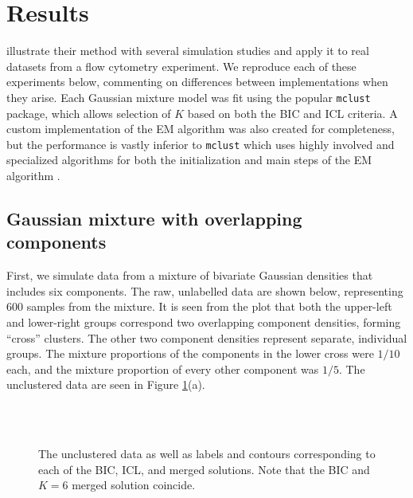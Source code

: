 \documentclass{uwstat572}
\renewcommand\;{\,}
\begin{document}
\section{Results}
\cite{Baudry10} illustrate their method with several simulation studies and apply it to real datasets from a flow cytometry experiment.
We reproduce each of these experiments below, commenting on differences between implementations when they arise.
Each Gaussian mixture model was fit using the popular \texttt{mclust} package, which allows selection of $K$ based on both the BIC and ICL criteria.
A custom implementation of the EM algorithm was also created for completeness, but the performance is vastly inferior to \texttt{mclust} which uses highly involved and specialized algorithms for both the initialization and main steps of the EM algorithm \citep{Scrucca16, Fraley96}.

\subsection{Gaussian mixture with overlapping components}
First, we simulate data from a mixture of bivariate Gaussian densities that includes six components.
The raw, unlabelled data are shown below, representing 600 samples from the mixture.
It is seen from the plot that both the upper-left and lower-right groups correspond two overlapping component densities, forming ``cross'' clusters.
The other two component densities represent separate, individual groups.
The mixture proportions of the components in the lower cross were $1/10$ each, and the mixture proportion of every other component was $1/5$. 
The unclustered data are seen in Figure \ref{Example1}(a).

\begin{figure}
\begin{center}
\\
\\
\end{center}
\caption{
The unclustered data as well as labels and contours corresponding to each of the BIC, ICL, and merged solutions. Note that the BIC and $K = 6$ merged solution coincide.
}
\label{Example1}
\end{figure}
\end{document}
